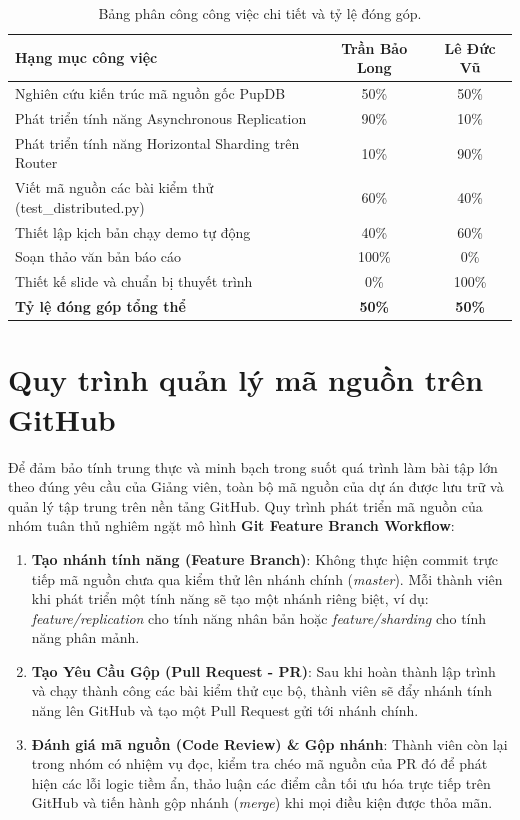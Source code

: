 \documentclass[12pt,a4paper]{report}
\begin{document}
\begin{table}[h]
    \centering
    \caption{Bảng phân công công việc chi tiết và tỷ lệ đóng góp.}
    \label{tab:contributions}
    \begin{tabular}{p{7cm}cc}
        \toprule
        \textbf{Hạng mục công việc} & \textbf{Trần Bảo Long} & \textbf{Lê Đức Vũ} \\
        \midrule
        Nghiên cứu kiến trúc mã nguồn gốc PupDB & 50\% & 50\% \\
        Phát triển tính năng Asynchronous Replication & 90\% & 10\% \\
        Phát triển tính năng Horizontal Sharding trên Router & 10\% & 90\% \\
        Viết mã nguồn các bài kiểm thử (test\_distributed.py) & 60\% & 40\% \\
        Thiết lập kịch bản chạy demo tự động & 40\% & 60\% \\
        Soạn thảo văn bản báo cáo  & 100\% & 0\% \\
        Thiết kế slide và chuẩn bị thuyết trình & 0\% & 100\% \\
        \midrule
        \textbf{Tỷ lệ đóng góp tổng thể} & \textbf{50\%} & \textbf{50\%} \\
        \bottomrule
    \end{tabular}
\end{table}

\section{Quy trình quản lý mã nguồn trên GitHub}
Để đảm bảo tính trung thực và minh bạch trong suốt quá trình làm bài tập lớn theo đúng yêu cầu của Giảng viên, toàn bộ mã nguồn của dự án được lưu trữ và quản lý tập trung trên nền tảng GitHub. 
Quy trình phát triển mã nguồn của nhóm tuân thủ nghiêm ngặt mô hình \textbf{Git Feature Branch Workflow}:
\begin{enumerate}
    \item \textbf{Tạo nhánh tính năng (Feature Branch)}: Không thực hiện commit trực tiếp mã nguồn chưa qua kiểm thử lên nhánh chính (\textit{master}). Mỗi thành viên khi phát triển một tính năng sẽ tạo một nhánh riêng biệt, ví dụ: \textit{feature/replication} cho tính năng nhân bản hoặc \textit{feature/sharding} cho tính năng phân mảnh.
    \item \textbf{Tạo Yêu Cầu Gộp (Pull Request - PR)}: Sau khi hoàn thành lập trình và chạy thành công các bài kiểm thử cục bộ, thành viên sẽ đẩy nhánh tính năng lên GitHub và tạo một Pull Request gửi tới nhánh chính.
    \item \textbf{Đánh giá mã nguồn (Code Review) \& Gộp nhánh}: Thành viên còn lại trong nhóm có nhiệm vụ đọc, kiểm tra chéo mã nguồn của PR đó để phát hiện các lỗi logic tiềm ẩn, thảo luận các điểm cần tối ưu hóa trực tiếp trên GitHub và tiến hành gộp nhánh (\textit{merge}) khi mọi điều kiện được thỏa mãn.
\end{enumerate}
\end{document}
